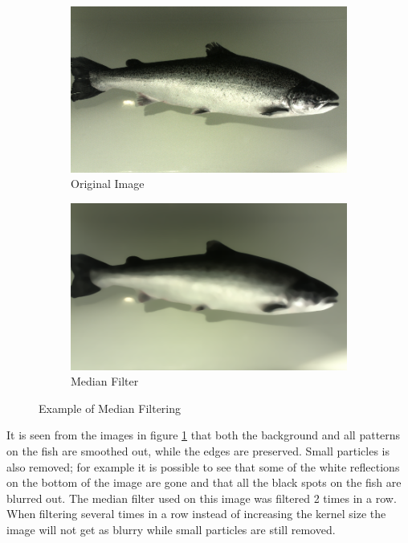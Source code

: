 \begin{figure}[ht]
    \centering
    \begin{subfigure}{0.5\textwidth}
        \centering
        \includegraphics[width=.99\linewidth]{images/literature/filtering/original_fish}
        \caption{Original Image}
    \end{subfigure}%
    \begin{subfigure}{.5\textwidth}
        \centering
        \includegraphics[width=.99\linewidth]{images/literature/filtering/median}
        \caption{Median Filter}
    \end{subfigure}
    \caption{Example of Median Filtering}
    \label{fig:median_filter}
\end{figure}

It is seen from the images in figure \ref{fig:median_filter} that both the background and all patterns on the fish are smoothed out, while the edges are preserved. Small particles is also removed; for example it is possible to see that some of the white reflections on the bottom of the image are gone and that all the black spots on the fish are blurred out. 
The median filter used on this image was filtered 2 times in a row. When filtering several times in a row instead of increasing the kernel size the image will not get as blurry while small particles are still removed.


